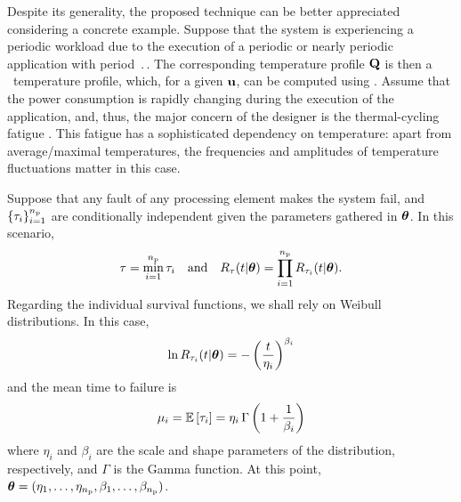 Despite its generality, the proposed technique can be better appreciated considering a concrete example.
Suppose that the system is experiencing a periodic workload due to the execution of a periodic or nearly periodic application with period $\period$.
The corresponding temperature profile $\mathbf{Q}$ is then a \dss\ temperature profile, which, for a given $\mathbf{u}$, can be computed using .
Assume that the power consumption is rapidly changing during the execution of the application, and, thus, the major concern of the designer is the thermal-cycling fatigue \cite{jedec2011}.
This fatigue has a sophisticated dependency on temperature: apart from average/maximal temperatures, the frequencies and amplitudes of temperature fluctuations matter in this case.

Suppose that any fault of any processing element makes the system fail, and $\{ \tau_i \}_{i = 1}^{n_\text{p}}$ are conditionally independent given the parameters gathered in $\bm{\theta}$.
In this scenario,
\[
  \tau = \min_{i = 1}^{n_\text{p}} \tau_i \hspace{1em} \text{and} \hspace{1em} R_\tau(t | \bm{\theta}) = \prod_{i = 1}^{n_\text{p}} R_{\tau_i}(t | \bm{\theta}).
\]
Regarding the individual survival functions, we shall rely on Weibull distributions.
In this case,
\begin{equation} \elab{weibull-model}
  \ln \survival_{\T_i}(\t | \pvw) = -\left( \frac{\t}{\eta_i} \right)^{\beta_i}
\end{equation}
and the mean time to failure is
\begin{equation} \elab{weibull-expectation}
  \mu_i = \expectation{\T_i} = \eta_i \, \Gamma\left(1 + \frac{1}{\beta_i}\right)
\end{equation}
where $\eta_i$ and $\beta_i$ are the scale and shape parameters of the distribution, respectively, and $\Gamma$ is the Gamma function.
At this point, $\bm{\theta} = (\eta_1, \dotsc, \eta_{n_\text{p}}, \beta_1, \dotsc, \beta_{n_\text{p}})$.

